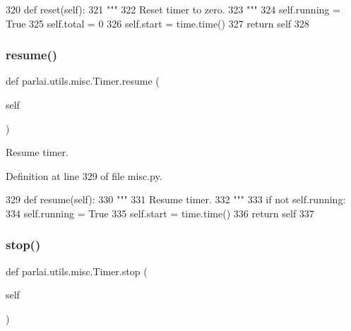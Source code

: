 \begin{DoxyCode}
320     \textcolor{keyword}{def }reset(self):
321         \textcolor{stringliteral}{"""}
322 \textcolor{stringliteral}{        Reset timer to zero.}
323 \textcolor{stringliteral}{        """}
324         self.running = \textcolor{keyword}{True}
325         self.total = 0
326         self.start = time.time()
327         \textcolor{keywordflow}{return} self
328 
\end{DoxyCode}
\mbox{\label{classparlai_1_1utils_1_1misc_1_1Timer_a855f1e8a3ba03fe16712fd7ae49dab46}} 
\subsubsection{\texorpdfstring{resume()}{resume()}}
{\footnotesize\ttfamily def parlai.\+utils.\+misc.\+Timer.\+resume (\begin{DoxyParamCaption}\item[{}]{self }\end{DoxyParamCaption})}

\begin{DoxyVerb}Resume timer.
\end{DoxyVerb}
 

Definition at line 329 of file misc.\+py.


\begin{DoxyCode}
329     \textcolor{keyword}{def }resume(self):
330         \textcolor{stringliteral}{"""}
331 \textcolor{stringliteral}{        Resume timer.}
332 \textcolor{stringliteral}{        """}
333         \textcolor{keywordflow}{if} \textcolor{keywordflow}{not} self.running:
334             self.running = \textcolor{keyword}{True}
335             self.start = time.time()
336         \textcolor{keywordflow}{return} self
337 
\end{DoxyCode}
\mbox{\label{classparlai_1_1utils_1_1misc_1_1Timer_a5a7a90c124ef1b1b92a550606a3c93b9}} 
\subsubsection{\texorpdfstring{stop()}{stop()}}
{\footnotesize\ttfamily def parlai.\+utils.\+misc.\+Timer.\+stop (\begin{DoxyParamCaption}\item[{}]{self }\end{DoxyParamCaption})}

